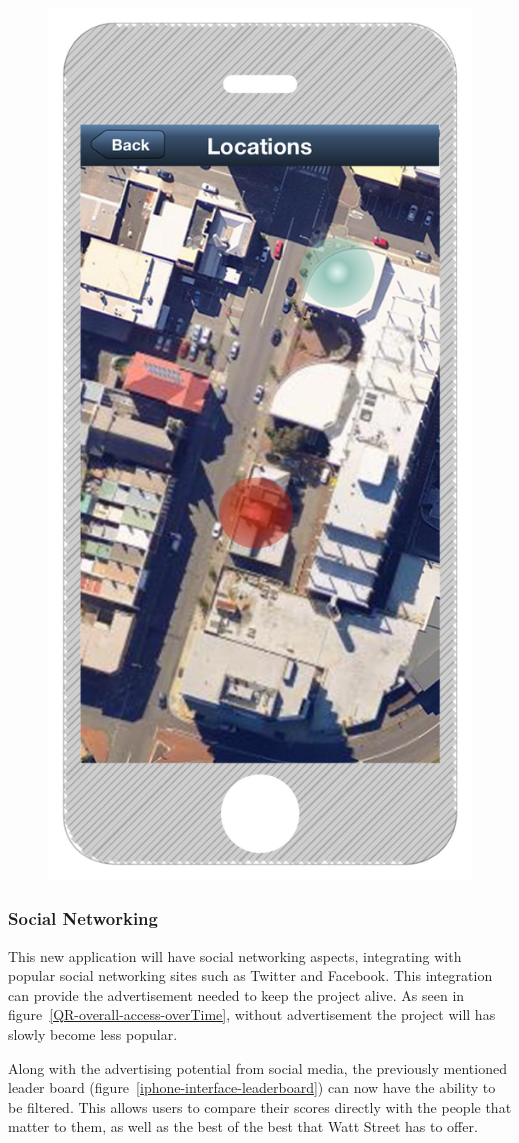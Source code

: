 \documentclass[a4paper,12pt]{article}
\begin{document}
\begin{figure}
\begin{minipage}{.5\textwidth}
  \includegraphics[width=.6\linewidth]{./images/iphone-interface-map}
  \label{iphone-interface-map}
\end{minipage}
\end{figure}


\subsubsection{Social Networking}
This new application will have social networking aspects, integrating with popular social networking sites such as Twitter and Facebook.
This integration can provide the advertisement needed to keep the project alive.
As seen in figure~\ref{QR-overall-access-overTime}, without advertisement the project will has slowly become less popular.

\par
Along with the advertising potential from social media, the previously mentioned leader board (figure~\ref{iphone-interface-leaderboard}) can now have the ability to be filtered.
This allows users to compare their scores directly with the people that matter to them, as well as the best of the best that Watt Street has to offer.
\end{document}
